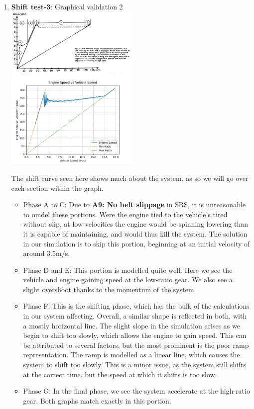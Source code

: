 \documentclass[12pt, titlepage]{article}
\begin{document}
\begin{enumerate}
\item{\textbf{Shift test-3}: Graphical validation 2}\\

\includegraphics[width=0.5\textwidth]{theoretical-figures/shift_curve.png}
\includegraphics[width=0.5\textwidth]{simulation-figures/shift_curve.png}

The shift curve seen here shows much about the system, as so we will go over each section within the graph.
\begin{itemize}
\item{Phase A to C:} Due to \textbf{A9: No belt slippage} in \href{https://github.com/gr812b/CVT-Simulator/blob/develop/docs/SRS/SRS.pdf}{SRS}, it is unreasonable to omdel these portions. Were the engine tied to the vehicle's tired without slip, at low velocities the engine would be spinning lowering than it is capable of maintaining, and would thus kill the system. The solution in our simulation is to skip this portion, beginning at an initial velocity of around 3.5m/s.
\item {Phase D and E:} This portion is modelled quite well. Here we see the vehicle and engine gaining speed at the low-ratio gear. We also see a slight overshoot thanks to the momentum of the system.
\item {Phase F:} This is the shifting phase, which has the bulk of the calculations in our system affecting. Overall, a similar shape is reflected in both, with a mostly horizontal line. The slight slope in the simulation arises as we begin to shift too slowly, which allows the engine to gain speed. This can be attributed to several factors, but the most prominent is the poor ramp representation. The ramp is modelled as a linear line, which causes the system to shift too slowly. This is a minor issue, as the system still shifts at the correct time, but the speed at which it shifts is too slow.
\item {Phase G:} In the final phase, we see the system accelerate at the high-ratio gear. Both graphs match exactly in this portion.
\end{itemize}


\end{enumerate}
\end{document}
